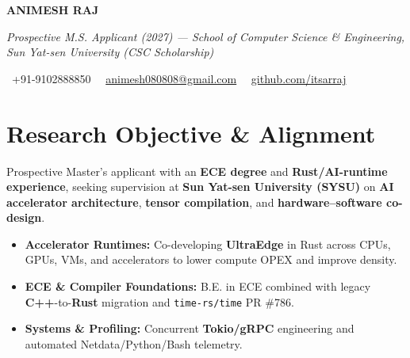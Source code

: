 \documentclass[a4paper,11pt]{article}
\newcommand{\socialicon}[1]{\raisebox{-0.05em}{\resizebox{!}{1em}{#1}}}
\newcommand{\headerfontiii}{\fontfamily{ppl}\selectfont} %
\begin{document}
\headerfontiii

\begin{center}
    {\Huge\textbf{ANIMESH RAJ}}
\end{center}
\vspace{-6mm}

\begin{center}
    {\small\textit{Prospective M.S. Applicant (2027) --- School of Computer Science \& Engineering, Sun Yat-sen University (CSC Scholarship)}}
\end{center}
\vspace{-6mm}

\begin{center}
    {\small
    \socialicon{\faPhone}\ +91-9102888850 \textbar\ 
    \socialicon{\faEnvelope}\ \href{mailto:animesh080808@gmail.com}{animesh080808@gmail.com} \textbar\ 
    \socialicon{\faGithub}\ \href{https://github.com/itsarraj}{github.com/itsarraj}
    }
\end{center}
\vspace{-4mm}

\section{\textbf{Research Objective \& Alignment}}
\vspace{1mm}
{\small
Prospective Master's applicant with an \textbf{ECE degree} and \textbf{Rust/AI-runtime experience}, seeking supervision at \textbf{Sun Yat-sen University (SYSU)} on \textbf{AI accelerator architecture}, \textbf{tensor compilation}, and \textbf{hardware–software co-design}.
\begin{itemize}[leftmargin=3ex, itemsep=0.4mm, topsep=1mm]
    \item \textbf{Accelerator Runtimes:} Co-developing \textbf{UltraEdge} in Rust across CPUs, GPUs, VMs, and accelerators to lower compute OPEX and improve density.
    \item \textbf{ECE \& Compiler Foundations:} B.E. in ECE combined with legacy \textbf{C++}-to-\textbf{Rust} migration and \texttt{time-rs/time} PR \#786.
    \item \textbf{Systems \& Profiling:} Concurrent \textbf{Tokio/gRPC} engineering and automated Netdata/Python/Bash telemetry.
\end{itemize}
}
\vspace{-3mm}
\end{document}
